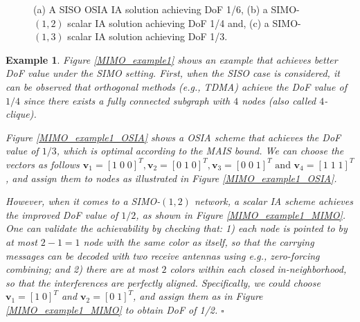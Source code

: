 \documentclass[a4paper,journal]{IEEEtran}
\def\v {\mathbf{v}}
\newtheorem{exe}{Example}
\begin{document}
\begin{figure*}[t]
   \centering
   \hfil
   \hfil
   \caption{(a) A SISO OSIA IA solution achieving DoF 1/6, (b) a SIMO-$(1,2)$ scalar IA solution achieving DoF 1/4 and, (c) a SIMO-$(1,3)$ scalar IA solution achieving DoF 1/3.}
   \label{large_graph_figure}
\end{figure*}
\begin{exe}
Figure \ref{MIMO_example1} shows an example that achieves better DoF value under the SIMO setting. First, when the SISO case is considered, it can be observed that orthogonal methods (e.g., TDMA) achieve the DoF value of $1/4$ since there exists a fully connected subgraph with $4$ nodes (also called $4$-clique). 

Figure \ref{MIMO_example1_OSIA} shows a OSIA scheme that achieves the DoF value of $1/3$, which is optimal according to the MAIS bound. We can choose the vectors as follows 
$\v_1=[1 \; 0\; 0]^T, \v_2=[0 \; 1\; 0]^T, \v_3=[0 \; 0 \; 1]^T \text{ and } \v_4=[1 \; 1\; 1]^T$, 
and assign them to nodes as illustrated in Figure \ref{MIMO_example1_OSIA}.

However, when it comes to a SIMO-$(1,2)$ network, a scalar IA scheme achieves the improved DoF value of $1/2$, as shown in Figure \ref{MIMO_example1_MIMO}. One can validate the achievability by checking that: 1) each node is pointed to by at most $2-1=1$ node with the same color as itself, so that the carrying messages can be decoded with two receive antennas using e.g., zero-forcing combining; and 2) there are at most $2$ colors within each closed in-neighborhood, so that the interferences are perfectly aligned. Specifically, we could choose $\v_1=[1 \; 0]^T$ and $\v_2=[0 \; 1]^T$, and assign them as in Figure \ref{MIMO_example1_MIMO} to obtain DoF of 1/2. \hfill $\square$
\end{exe}
\end{document}
